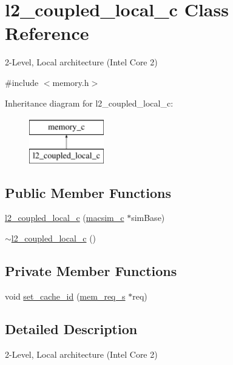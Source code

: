 \hypertarget{classl2__coupled__local__c}{
\section{l2\_\-coupled\_\-local\_\-c Class Reference}
\label{classl2__coupled__local__c}
}


2-\/Level, Local architecture (Intel Core 2)  




{\ttfamily \#include $<$memory.h$>$}

Inheritance diagram for l2\_\-coupled\_\-local\_\-c:\begin{figure}[H]
\begin{center}
\leavevmode
\includegraphics[height=2.000000cm]{classl2__coupled__local__c}
\end{center}
\end{figure}
\subsection*{Public Member Functions}
\begin{DoxyCompactItemize}
\item 
\hyperlink{classl2__coupled__local__c_ad323f078614dcc1ca6ee5329addf7a44}{l2\_\-coupled\_\-local\_\-c} (\hyperlink{classmacsim__c}{macsim\_\-c} $\ast$simBase)
\item 
\hyperlink{classl2__coupled__local__c_a721a9db728856d12ef03549e561d57ca}{$\sim$l2\_\-coupled\_\-local\_\-c} ()
\end{DoxyCompactItemize}
\subsection*{Private Member Functions}
\begin{DoxyCompactItemize}
\item 
void \hyperlink{classl2__coupled__local__c_a4f3ca72f4a2ee33fa7f8b97b21e72364}{set\_\-cache\_\-id} (\hyperlink{structmem__req__s}{mem\_\-req\_\-s} $\ast$req)
\end{DoxyCompactItemize}


\subsection{Detailed Description}
2-\/Level, Local architecture (Intel Core 2) 

